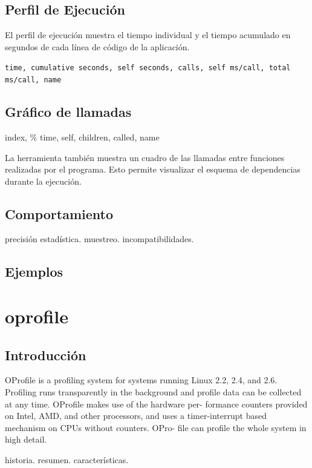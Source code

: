 \documentclass[a4paper]{report}
\begin{document}
\subsection{Perfil de Ejecuci\'on}

El perfil de ejecuci\'on muestra el tiempo individual y el tiempo acumulado en segundos
de cada l\'inea de c\'odigo de la aplicaci\'on.

{\tt time, cumulative seconds, self seconds, calls, self ms/call,
  total ms/call, name}

\subsection{Gr\'afico de llamadas}

index, \% time, self, children, called, name

La herramienta tambi\'en muestra un cuadro de las llamadas entre funciones realizadas por el programa.
Esto permite visualizar el esquema de dependencias durante la ejecuci\'on.

\subsection{Comportamiento}

precisi\'on estad\'istica. muestreo. incompatibilidades.

\subsection{Ejemplos}

\section{oprofile}

\subsection{Introducci\'on}

OProfile  is a profiling system for systems running Linux 2.2, 2.4, and
       2.6. Profiling runs transparently in the background  and  profile  data
       can  be  collected at any time. OProfile makes use of the hardware per-
       formance counters provided on Intel, AMD,  and  other  processors,  and
       uses a timer-interrupt based mechanism on CPUs without counters.  OPro-
       file can profile the whole system in high detail.

historia. resumen. caracter\'isticas. 
\end{document}
